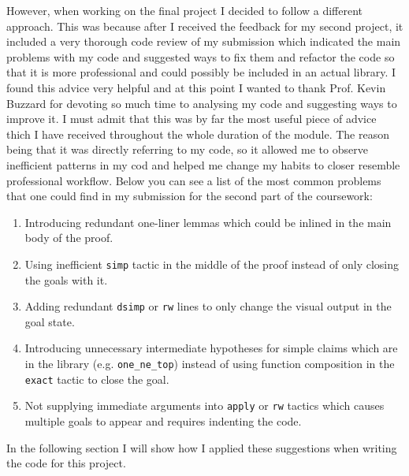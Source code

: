 \documentclass[11pt]{article}
\begin{document}
However, when working on the final project I decided to follow a different approach.
This was because after I received the feedback for my second project, it included
a very thorough code review of my submission which indicated the main problems
with my code and suggested ways to fix them and refactor the code so that it is
more professional and could possibly be included in an actual library. I found
this advice very helpful and at this point I wanted to thank Prof. Kevin Buzzard
for devoting so much time to analysing my code and suggesting ways to improve it.
I must admit that this was by far the most useful piece of advice thich I have
received throughout the whole duration of the module. The reason being that it
was directly referring to my code, so it allowed me to observe inefficient patterns
in my cod  and helped me change my habits to closer resemble professional workflow.
Below you can see a list of the most common problems that one could find in my
submission for the second part of the coursework:
\begin{enumerate}
  \item Introducing redundant one-liner lemmas which could be inlined in the main
    body of the proof.
  \item Using inefficient \texttt{simp} tactic in the middle of the proof instead of only closing the goals with it.
  \item Adding redundant \texttt{dsimp} or \texttt{rw} lines to only change the visual output in the goal state.
  \item Introducing unnecessary intermediate hypotheses for simple claims which
    are in the library (e.g. \texttt{one\_ne\_top}) instead of using function composition
    in the \texttt{exact} tactic to close the goal.
  \item Not supplying immediate arguments into \texttt{apply} or \texttt{rw} tactics
    which causes multiple goals to appear and requires indenting the code.
\end{enumerate}
In the following section I will show how I applied these suggestions when writing
the code for this project.
\end{document}
